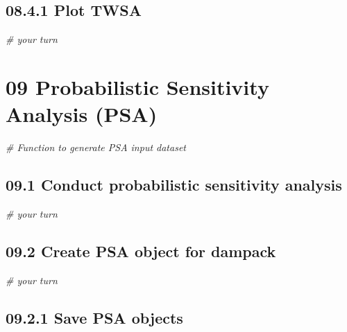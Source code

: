 \documentclass[]{article}
\newenvironment{Shaded}{\begin{snugshade}}{\end{snugshade}}
\newcommand{\CommentTok}[1]{\textcolor[rgb]{0.56,0.35,0.01}{\textit{#1}}}
\begin{document}
\subsection{08.4.1 Plot TWSA}\label{plot-twsa}

\begin{Shaded}
\begin{Highlighting}[]
\CommentTok{# your turn}
\end{Highlighting}
\end{Shaded}

\section{09 Probabilistic Sensitivity Analysis
(PSA)}\label{probabilistic-sensitivity-analysis-psa}

\begin{Shaded}
\begin{Highlighting}[]
\CommentTok{# Function to generate PSA input dataset}
\end{Highlighting}
\end{Shaded}

\subsection{09.1 Conduct probabilistic sensitivity
analysis}\label{conduct-probabilistic-sensitivity-analysis}

\begin{Shaded}
\begin{Highlighting}[]
\CommentTok{# your turn}
\end{Highlighting}
\end{Shaded}

\subsection{09.2 Create PSA object for
dampack}\label{create-psa-object-for-dampack}

\begin{Shaded}
\begin{Highlighting}[]
\CommentTok{# your turn}
\end{Highlighting}
\end{Shaded}

\subsection{09.2.1 Save PSA objects}\label{save-psa-objects}
\end{document}

